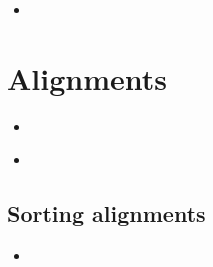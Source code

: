 \documentclass[compress, ucs, xelatex, 11pt, xcolor=x11names, aspectratio=1609,
	hyperref={
		bookmarks=true,
		unicode=true,
		colorlinks=true,
		pdftitle={HybSeq course},
		plainpages=false,
		pdfauthor={Vojtech Zeisek},
		pdfsubject={Practical processing of HybSeq target enrichment sequencing data on computing grids like MetaCentrum},
		pdfcreator={XeLaTeX},
		pdfkeywords={BASH, command line, GNU, HybSeq, Linux, MetaCentrum, sequencing shell, target enrichment},
		linkcolor=Cyan2, %
		anchorcolor=Firebrick2, %
		citecolor=Firebrick2, %
		filecolor=Firebrick2, %
		menucolor=Firebrick2, %
		urlcolor=Chartreuse2, %
		pdftex},
	url={hyphens, lowtilde} %
	]{beamer}
\begin{document}
\begin{frame}[fragile]{}
	\begin{itemize}
		\item 
	\end{itemize}
	\begin{spluscode}
    
	\end{spluscode}
	\begin{bashcode}
    
	\end{bashcode}
\end{frame}

\section{Alignments}

\begin{frame}[fragile]{}
	\begin{itemize}
		\item 
	\end{itemize}
	\begin{spluscode}
    
	\end{spluscode}
	\begin{bashcode}
    
	\end{bashcode}
\end{frame}

\begin{frame}[fragile]{}
	\begin{itemize}
		\item 
	\end{itemize}
	\begin{spluscode}
    
	\end{spluscode}
	\begin{bashcode}
    
	\end{bashcode}
\end{frame}

\subsection{Sorting alignments}

\begin{frame}[fragile]{}
	\begin{itemize}
		\item 
	\end{itemize}
	\begin{spluscode}
    
	\end{spluscode}
	\begin{bashcode}
    
	\end{bashcode}
\end{frame}
\end{document}
